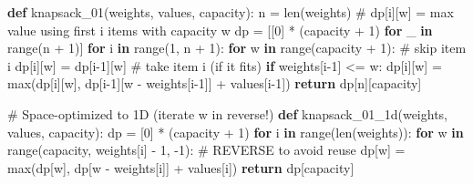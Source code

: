 \documentclass[11pt]{article}
\newenvironment{Shaded}{\begin{snugshade}}{\end{snugshade}}
\newcommand{\BuiltInTok}[1]{\textcolor[rgb]{0.50,0.55,0.55}{#1}}
\newcommand{\CommentTok}[1]{\textcolor[rgb]{0.48,0.49,0.49}{#1}}
\newcommand{\ControlFlowTok}[1]{\textcolor[rgb]{0.99,0.74,0.29}{\textbf{#1}}}
\newcommand{\DecValTok}[1]{\textcolor[rgb]{0.96,0.45,0.00}{#1}}
\newcommand{\KeywordTok}[1]{\textcolor[rgb]{0.81,0.81,0.76}{\textbf{#1}}}
\newcommand{\NormalTok}[1]{\textcolor[rgb]{0.81,0.81,0.76}{#1}}
\newcommand{\OperatorTok}[1]{\textcolor[rgb]{0.81,0.81,0.76}{#1}}
\begin{document}

\begin{Shaded}
\begin{Highlighting}[]
\KeywordTok{def}\NormalTok{ knapsack\_01(weights, values, capacity):}
\NormalTok{    n }\OperatorTok{=} \BuiltInTok{len}\NormalTok{(weights)}
    \CommentTok{\# dp[i][w] = max value using first i items with capacity w}
\NormalTok{    dp }\OperatorTok{=}\NormalTok{ [[}\DecValTok{0}\NormalTok{] }\OperatorTok{*}\NormalTok{ (capacity }\OperatorTok{+} \DecValTok{1}\NormalTok{) }\ControlFlowTok{for}\NormalTok{ \_ }\KeywordTok{in} \BuiltInTok{range}\NormalTok{(n }\OperatorTok{+} \DecValTok{1}\NormalTok{)]}
    \ControlFlowTok{for}\NormalTok{ i }\KeywordTok{in} \BuiltInTok{range}\NormalTok{(}\DecValTok{1}\NormalTok{, n }\OperatorTok{+} \DecValTok{1}\NormalTok{):}
        \ControlFlowTok{for}\NormalTok{ w }\KeywordTok{in} \BuiltInTok{range}\NormalTok{(capacity }\OperatorTok{+} \DecValTok{1}\NormalTok{):}
            \CommentTok{\# skip item i}
\NormalTok{            dp[i][w] }\OperatorTok{=}\NormalTok{ dp[i}\OperatorTok{{-}}\DecValTok{1}\NormalTok{][w]}
            \CommentTok{\# take item i (if it fits)}
            \ControlFlowTok{if}\NormalTok{ weights[i}\OperatorTok{{-}}\DecValTok{1}\NormalTok{] }\OperatorTok{\textless{}=}\NormalTok{ w:}
\NormalTok{                dp[i][w] }\OperatorTok{=} \BuiltInTok{max}\NormalTok{(dp[i][w], dp[i}\OperatorTok{{-}}\DecValTok{1}\NormalTok{][w }\OperatorTok{{-}}\NormalTok{ weights[i}\OperatorTok{{-}}\DecValTok{1}\NormalTok{]] }\OperatorTok{+}\NormalTok{ values[i}\OperatorTok{{-}}\DecValTok{1}\NormalTok{])}
    \ControlFlowTok{return}\NormalTok{ dp[n][capacity]}

\CommentTok{\# Space{-}optimized to 1D (iterate w in reverse!)}
\KeywordTok{def}\NormalTok{ knapsack\_01\_1d(weights, values, capacity):}
\NormalTok{    dp }\OperatorTok{=}\NormalTok{ [}\DecValTok{0}\NormalTok{] }\OperatorTok{*}\NormalTok{ (capacity }\OperatorTok{+} \DecValTok{1}\NormalTok{)}
    \ControlFlowTok{for}\NormalTok{ i }\KeywordTok{in} \BuiltInTok{range}\NormalTok{(}\BuiltInTok{len}\NormalTok{(weights)):}
        \ControlFlowTok{for}\NormalTok{ w }\KeywordTok{in} \BuiltInTok{range}\NormalTok{(capacity, weights[i] }\OperatorTok{{-}} \DecValTok{1}\NormalTok{, }\OperatorTok{{-}}\DecValTok{1}\NormalTok{):   }\CommentTok{\# REVERSE to avoid reuse}
\NormalTok{            dp[w] }\OperatorTok{=} \BuiltInTok{max}\NormalTok{(dp[w], dp[w }\OperatorTok{{-}}\NormalTok{ weights[i]] }\OperatorTok{+}\NormalTok{ values[i])}
    \ControlFlowTok{return}\NormalTok{ dp[capacity]}
\end{Highlighting}
\end{Shaded}
\end{document}
